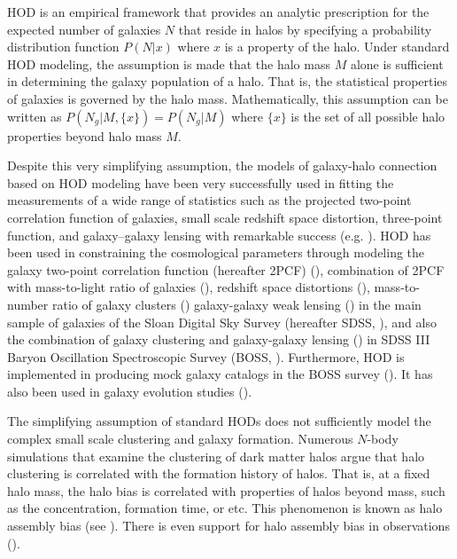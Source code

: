 HOD is an empirical framework that provides an analytic prescription for the expected number of galaxies $N$ that reside in halos by specifying a probability distribution function $P(N|x)$ where $x$ is a property of the halo. Under standard HOD modeling, the assumption is made that the halo mass $M$ alone is sufficient in determining the galaxy population of a halo. That is, the statistical properties of galaxies is governed by the halo mass. Mathematically, this assumption can be written as $P(N_g|M,\{x\})=P(N_g|M)$ where $\{x\}$ is the set of all possible halo properties beyond halo mass $M$.

Despite this very simplifying assumption, the models of galaxy-halo connection based on HOD modeling have been very successfully used in fitting the measurements of a wide range of statistics such as the projected two-point correlation function of galaxies, small scale redshift space distortion, three-point function, and galaxy--galaxy lensing with remarkable success (e.g. \citealt{zheng07,tinker_rsd2007,zehavi2011,leauthaud12,parejko2013,coupon2015,hod-3pcf,guo2015,miyatake15,zu2015,hod_vs_sham}). 
HOD has been used in constraining the cosmological parameters through modeling the galaxy two-point correlation function (hereafter 2PCF) (\citealt{abazajian2005}), combination of 2PCF with mass-to-light ratio of galaxies (\citealt{tinker05}), redshift space distortions (\citealt{tinker_rsd2007}), mass-to-number ratio of galaxy clusters (\citealt{tinker2012}) galaxy-galaxy weak lensing (\citealt{vdb03,cacciato13,more13,vdb13}) in the main sample of galaxies
of the Sloan Digital Sky Survey (hereafter SDSS, \citealt{york2000}), and also the combination of galaxy clustering and galaxy-galaxy lensing (\citealt{more15}) in SDSS III Baryon Oscillation Spectroscopic Survey (BOSS, \citealt{boss}). Furthermore, HOD is implemented in producing mock galaxy catalogs in the BOSS survey (\citealt{manera2013,white2014}). It has also been used in galaxy evolution studies (\citealt{conroy09,leauthaud12,behroozi13,hudson2015,zu2015,zu2016}).

The simplifying assumption of standard HODs  
does not sufficiently model the complex small scale clustering and galaxy
formation. Numerous $N$-body simulations that examine the clustering of 
dark matter halos argue that halo clustering is correlated with the formation 
history of halos. That is, at a fixed halo mass, the halo bias is correlated 
with properties of halos beyond mass, such as the concentration, formation time, or etc. 
This phenomenon is known as halo assembly bias (see \citealt{sheth2004,gao2005, harker2006, weschler2006, gao2007,croton2007,wang2007,angulo2008,dalal2008,li2008,sunayama2016}). 
There is even support for halo assembly bias in observations (\citealt{miyatake2016,more2016}).

